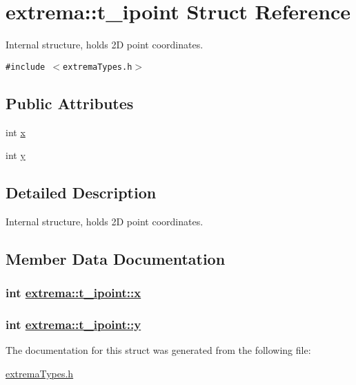 \hypertarget{structextrema_1_1t__ipoint}{
\section{extrema::t\_\-ipoint Struct Reference}
\label{structextrema_1_1t__ipoint}
}
Internal structure, holds 2D point coordinates.  


{\tt \#include $<$extrema\-Types.h$>$}

\subsection*{Public Attributes}
\begin{CompactItemize}
\item 
int \hyperlink{structextrema_1_1t__ipoint_5381d44206d1d67b71ffef0446df0dea}{x}
\item 
int \hyperlink{structextrema_1_1t__ipoint_6d3b860b581b310890444a35e4d56fbd}{y}
\end{CompactItemize}


\subsection{Detailed Description}
Internal structure, holds 2D point coordinates. 



\subsection{Member Data Documentation}
\hypertarget{structextrema_1_1t__ipoint_5381d44206d1d67b71ffef0446df0dea}{
\subsubsection[x]{\setlength{\rightskip}{0pt plus 5cm}int \hyperlink{structextrema_1_1t__ipoint_5381d44206d1d67b71ffef0446df0dea}{extrema::t\_\-ipoint::x}}}
\label{structextrema_1_1t__ipoint_5381d44206d1d67b71ffef0446df0dea}


\hypertarget{structextrema_1_1t__ipoint_6d3b860b581b310890444a35e4d56fbd}{
\subsubsection[y]{\setlength{\rightskip}{0pt plus 5cm}int \hyperlink{structextrema_1_1t__ipoint_6d3b860b581b310890444a35e4d56fbd}{extrema::t\_\-ipoint::y}}}
\label{structextrema_1_1t__ipoint_6d3b860b581b310890444a35e4d56fbd}




The documentation for this struct was generated from the following file:\begin{CompactItemize}
\item 
\hyperlink{extremaTypes_8h}{extrema\-Types.h}\end{CompactItemize}
